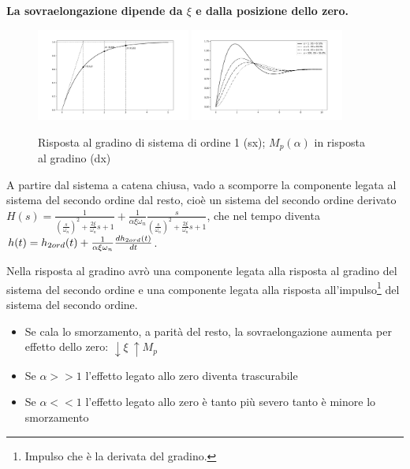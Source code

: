 \textbf{La sovraelongazione dipende da \(\xi\) e dalla posizione dello zero.}

\begin{figure}[h]
    \centering
    \includegraphics[width=0.45\textwidth]{Immagini/risposta_gradino_ord1_tempo.png}
    \includegraphics[width=0.45\textwidth]{Immagini/influenza_zero_su_sovraelong.png}
    \caption{Risposta al gradino di sistema di ordine 1 (sx); \(M_p(\alpha)\) in risposta al gradino (dx)}
\end{figure}

A partire dal sistema a catena chiusa, vado a scomporre la componente legata al sistema del secondo ordine dal resto, cioè un sistema del secondo ordine derivato \(H(s)=\frac{1}{\left(\frac{s}{\omega_n}\right)^2+\frac{2\xi}{\omega_n}s+1} + \frac{1}{\alpha \xi \omega_n}\frac{s}{\left(\frac{s}{\omega_n}\right)^2+\frac{2\xi}{\omega_n}s+1}\), che nel tempo diventa \(h(t)=h_{2 ord}(t) + \frac{1}{\alpha \xi \omega_n} \frac{dh_{2 ord}(t)}{dt}\).

Nella risposta al gradino avrò una componente legata alla risposta al gradino del sistema del secondo ordine e una componente legata alla risposta all'impulso\footnote{Impulso che è la derivata del gradino.} del sistema del secondo ordine.
\begin{itemize}
    \item Se cala lo smorzamento, a parità del resto, la sovraelongazione aumenta per effetto dello zero: \(\downarrow \xi \ \uparrow M_p\)
    \item Se \(\alpha >>1\) l'effetto legato allo zero diventa trascurabile
    \item Se \(\alpha <<1\) l'effetto legato allo zero è tanto più severo tanto è minore lo smorzamento
\end{itemize}

